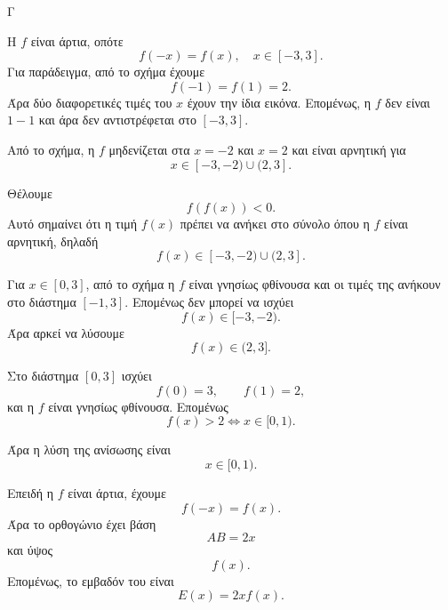 \begin{thema}{Γ}

\begin{center}
\end{center}

\begin{erwthma}
\item Η $f$ είναι άρτια, οπότε
\[
f(-x)=f(x),\quad x\in[-3,3].
\]
Για παράδειγμα, από το σχήμα έχουμε
\[
f(-1)=f(1)=2.
\]
Άρα δύο διαφορετικές τιμές του $x$ έχουν την ίδια εικόνα. Επομένως, η $f$ δεν είναι $1-1$ και άρα δεν αντιστρέφεται στο $[-3,3]$.

Από το σχήμα, η $f$ μηδενίζεται στα $x=-2$ και $x=2$ και είναι αρνητική για
\[
x\in[-3,-2)\cup(2,3].
\]

Θέλουμε
\[
f(f(x))<0.
\]
Αυτό σημαίνει ότι η τιμή $f(x)$ πρέπει να ανήκει στο σύνολο όπου η $f$ είναι αρνητική, δηλαδή
\[
f(x)\in[-3,-2)\cup(2,3].
\]

Για $x\in[0,3]$, από το σχήμα η $f$ είναι γνησίως φθίνουσα και οι τιμές της ανήκουν στο διάστημα $[-1,3]$. Επομένως δεν μπορεί να ισχύει
\[
f(x)\in[-3,-2).
\]
Άρα αρκεί να λύσουμε
\[
f(x)\in(2,3].
\]

Στο διάστημα $[0,3]$ ισχύει
\[
f(0)=3,\qquad f(1)=2,
\]
και η $f$ είναι γνησίως φθίνουσα. Επομένως
\[
f(x)>2 \Leftrightarrow x\in[0,1).
\]

Άρα η λύση της ανίσωσης είναι
\[
x\in[0,1).
\]

\item Επειδή η $f$ είναι άρτια, έχουμε
\[
f(-x)=f(x).
\]
Άρα το ορθογώνιο έχει βάση
\[
AB=2x
\]
και ύψος
\[
f(x).
\]
Επομένως, το εμβαδόν του είναι
\[
E(x)=2x f(x).
\]


\end{erwthma}
\end{thema}

